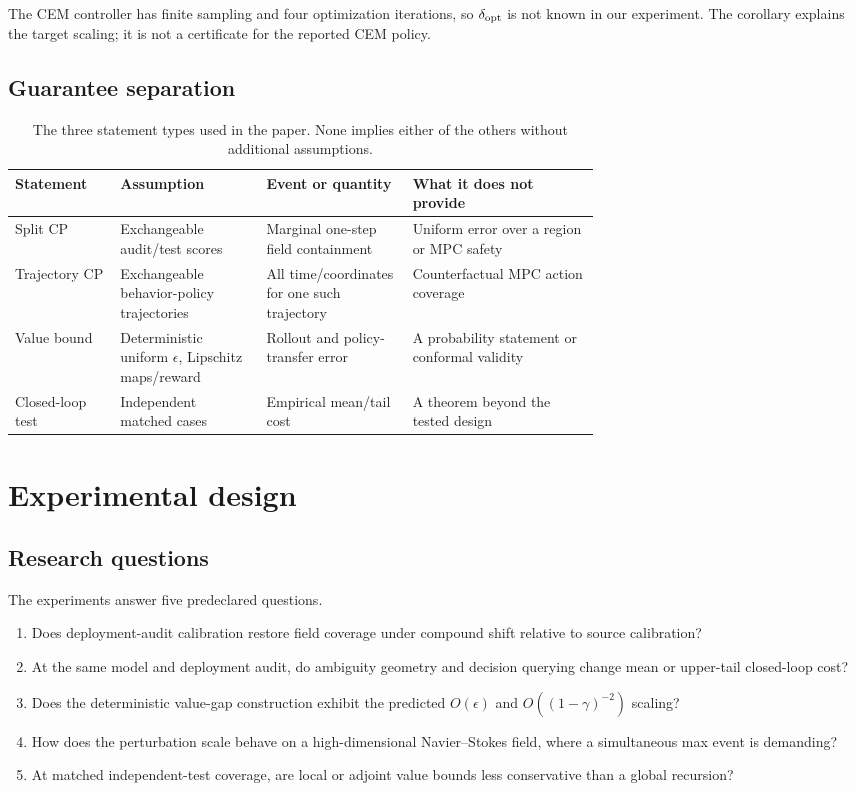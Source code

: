 \documentclass[10pt]{article}
\begin{document}
The CEM controller has finite sampling and four optimization iterations, so
$\delta_{\rm opt}$ is not known in our experiment. The corollary explains the
target scaling; it is not a certificate for the reported CEM policy.

\subsection{Guarantee separation}

\begin{table}[H]
\centering
\small
\caption{The three statement types used in the paper. None implies either of
the others without additional assumptions.}
\label{tab:guarantees}
\begin{tabularx}{\linewidth}{@{}p{0.18\linewidth}p{0.25\linewidth}p{0.25\linewidth}X@{}}
\toprule
Statement & Assumption & Event or quantity & What it does not provide\\
\midrule
Split CP & Exchangeable audit/test scores & Marginal one-step field containment & Uniform error over a region or MPC safety\\
Trajectory CP & Exchangeable behavior-policy trajectories & All time/coordinates for one such trajectory & Counterfactual MPC action coverage\\
Value bound & Deterministic uniform $\epsilon$, Lipschitz maps/reward & Rollout and policy-transfer error & A probability statement or conformal validity\\
Closed-loop test & Independent matched cases & Empirical mean/tail cost & A theorem beyond the tested design\\
\bottomrule
\end{tabularx}
\end{table}

\section{Experimental design}

\subsection{Research questions}

The experiments answer five predeclared questions.
\begin{enumerate}[label=\textbf{RQ\arabic*.}]
\item Does deployment-audit calibration restore field coverage under compound
shift relative to source calibration?
\item At the same model and deployment audit, do ambiguity geometry and
decision querying change mean or upper-tail closed-loop cost?
\item Does the deterministic value-gap construction exhibit the predicted
$O(\epsilon)$ and $O((1-\gamma)^{-2})$ scaling?
\item How does the perturbation scale behave on a high-dimensional
Navier--Stokes field, where a simultaneous max event is demanding?
\item At matched independent-test coverage, are local or adjoint value bounds
less conservative than a global recursion?
\end{enumerate}
\end{document}
